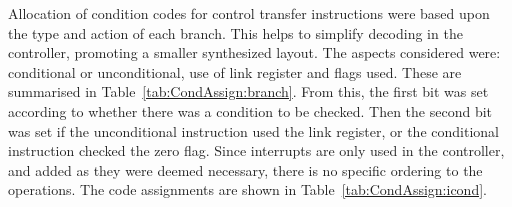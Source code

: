 Allocation of condition codes for control transfer instructions were based upon the type and action of each branch. This helps to simplify decoding in the controller, promoting a smaller synthesized layout. 
The aspects considered were: conditional or unconditional, use of link register and flags used. 
These are summarised in Table~\ref{tab:CondAssign:branch}. 
From this, the first bit was set according to whether there was a condition to be checked. 
Then the second bit was set if the unconditional instruction used the link register, or the conditional instruction checked the zero flag. 
Since interrupts are only used in the controller, and added as they were deemed necessary, there is no specific ordering to the operations. 
The code assignments are shown in Table~\ref{tab:CondAssign:icond}. 

\begin{table}[h!]
\caption{Condition Code Assignments}
\label{tab:CondAssign}
\def\arraystretch{1.2}
\centering
\footnotesize
{}

\end{table}
